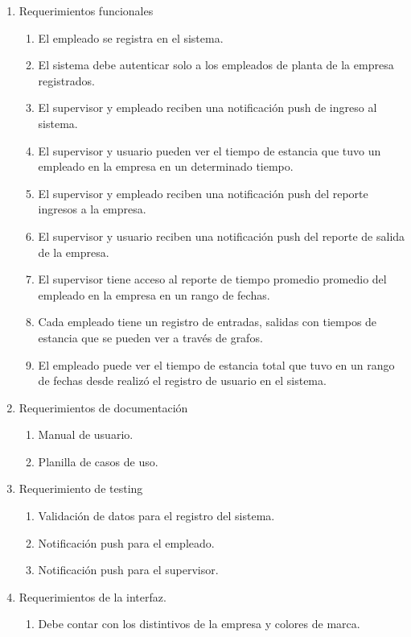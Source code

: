 \documentclass[
11pt, %
]{charter}
\begin{document}
\begin{enumerate}
	\item Requerimientos funcionales
		\begin{enumerate}
			\item El empleado se registra en el sistema.
			\item El sistema debe autenticar solo a los empleados de planta de la empresa registrados.
			\item El supervisor y empleado reciben una notificación push de ingreso al sistema.
			\item El supervisor y usuario pueden ver el tiempo de estancia que tuvo un empleado en la empresa en un determinado tiempo.
			\item El supervisor y empleado reciben una notificación push del reporte ingresos a la empresa.
			\item El supervisor y usuario reciben una notificación push del reporte de salida de la empresa.
			\item El supervisor tiene acceso al reporte de tiempo promedio promedio del empleado en la empresa en un rango de fechas. 
			\item Cada empleado tiene un registro de entradas, salidas con tiempos de estancia que se pueden ver a través de grafos.
			\item El empleado puede ver el tiempo de estancia total  que tuvo en un rango de fechas desde realizó el registro de usuario en el sistema.
		\end{enumerate}
	\item Requerimientos de documentación
		\begin{enumerate}
			\item Manual de usuario.
			\item Planilla de casos de uso.
		\end{enumerate}
	\item Requerimiento de testing
		\begin{enumerate}
			\item Validación de datos para el registro del sistema.
			\item Notificación push para el empleado.
			\item Notificación push para el supervisor.
		\end{enumerate}
	\item Requerimientos de la interfaz.
			\begin{enumerate}
			\item Debe contar con los distintivos de la empresa y colores de marca.

\end{enumerate}
\end{enumerate}
\end{document}
